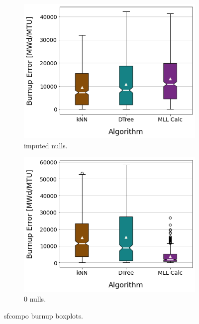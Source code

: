 \begin{figure}[!ht]
  \centering
  \begin{subfigure}[b]{0.49\textwidth}
    \centering
    \includegraphics[width=\textwidth]{./chapters/exp1/sfcompo_boxplots_impnull_burn.png}
    \caption{imputed nulls.}
    \label{fig:burnimp}
  \end{subfigure}
  \hfill
  \begin{subfigure}[b]{0.49\textwidth}
    \centering
    \includegraphics[width=\textwidth]{./chapters/exp1/sfcompo_boxplots_0null_burn.png}
    \caption{0 nulls.}
    \label{fig:burn0}
  \end{subfigure}
  \caption{sfcompo burnup boxplots.}
  \label{fig:sfcoburn}
\end{figure}

